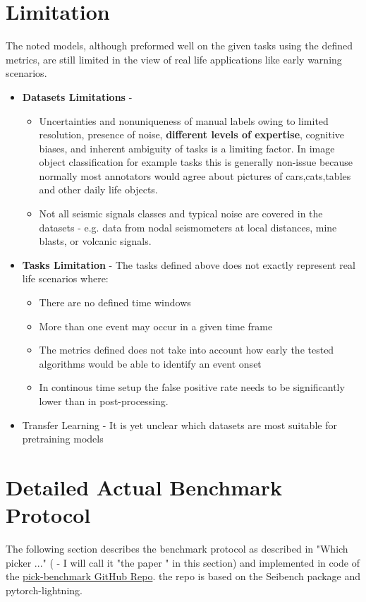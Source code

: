 \documentclass[11pt,a4paper]{article}
\begin{document}
\section{Limitation}

The noted models, although preformed well on the given tasks using the defined metrics, are still limited in the view of real life applications like early warning scenarios.

\begin{itemize}
\item \textbf{Datasets Limitations}  -
\begin{itemize}
\item Uncertainties and nonuniqueness of manual labels owing to limited resolution, presence of noise, \textbf{different levels of expertise}, cognitive biases, and inherent ambiguity of
tasks is a limiting factor. In image object classification for example tasks this is generally non-issue because normally most annotators would agree about pictures of cars,cats,tables and other daily life objects.
\item Not all seismic signals classes and typical noise are covered in the datasets - e.g. data from nodal seismometers at local distances, mine blasts, or volcanic signals.
\end{itemize}

 
\item \textbf{Tasks Limitation} - The tasks defined above does not exactly represent real life scenarios where:
\begin{itemize}
\item There are no defined time windows
\item More than one event may occur in a given time frame
\item The metrics defined does not take into account how early the tested algorithms would be able to identify an event onset
\item In continous time setup the false positive rate needs to be significantly lower than in post-processing.
\end{itemize}

\item Transfer Learning - It is yet unclear which datasets are most suitable for pretraining models

\end{itemize}


\section{Detailed Actual Benchmark Protocol}
The following section describes the benchmark protocol as described in "Which picker ..." ( - I will call it "the paper " in this section) and  implemented in code of the  \href{https://github.com/seisbench/pick-benchmark}{pick-benchmark GitHub Repo}. the repo is based on the Seibench package and pytorch-lightning.
\end{document}
